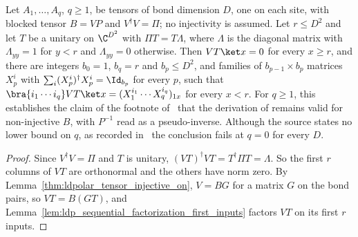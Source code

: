 \begin{lemma}
    \label{thm:ldp_sequential_factorization_partial}
    \leanok
    Let $A_1,\dots,A_q$, $q\ge1$, be tensors of bond dimension $D$, one on each
    site, with blocked tensor $B=VP$ and $V^\dagger V=\Pi$; no injectivity is
    assumed. Let $r\le D^2$ and let $T$ be a unitary on $\C^{D^2}$ with
    $\Pi T=T\Lambda$, where $\Lambda$ is the diagonal matrix with $\Lambda_{yy}=1$
    for $y<r$ and $\Lambda_{yy}=0$ otherwise. Then $VT\ket x=0$ for every
    $x\ge r$, and there are integers $b_0=1$, $b_q=r$ and $b_p\le D^2$, and
    families of $b_{p-1}\times b_p$ matrices $X_p^i$ with
    $\sum_i(X_p^i)^\dagger X_p^i=\Id_{b_p}$ for every $p$, such that
    $\bra{i_1\cdots i_q}VT\ket x=(X_1^{i_1}\cdots X_q^{i_q})_{1x}$ for every
    $x<r$. For $q\ge1$, this establishes the claim of the footnote
    of~\cite[paragraph ``The sequential-RG circuit'']{Malz2024Preparation} that the
    derivation of \cite[eqs.~(13)--(15)]{Malz2024Preparation} remains valid for
    non-injective $B$, with $P^{-1}$ read as a pseudo-inverse. Although the source
    states no lower bound on $q$, as recorded
    in~\cite{gap:mswc24_sequential_factorization_positive_block_length} the
    conclusion fails at $q=0$ for every $D$.
\end{lemma}
\begin{proof}
    \leanok
    Since $V^\dagger V=\Pi$ and $T$ is unitary, $(VT)^\dagger VT=T^\dagger\Pi
        T=\Lambda$. So the first $r$ columns of $VT$ are orthonormal and the
    others have norm zero. By Lemma~\ref{thm:ldpolar_tensor_injective_on},
    $V=BG$ for a matrix $G$ on the bond pairs, so $VT=B(GT)$, and
    Lemma~\ref{lem:ldp_sequential_factorization_first_inputs} factors $VT$ on
    its first $r$ inputs.
\end{proof}

